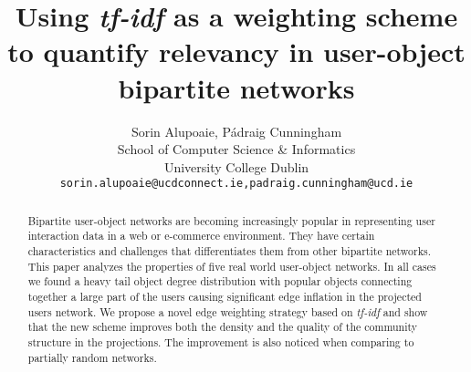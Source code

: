\documentclass[a4paper,12pt]{article} %
\title{Using \emph{tf-idf} as a weighting scheme to quantify relevancy in
user-object bipartite networks}
\author{
Sorin Alupoaie, P\'{a}draig Cunningham \\
School of Computer Science \& Informatics\\
University College Dublin\\
\small{\texttt{sorin.alupoaie@ucdconnect.ie,padraig.cunningham@ucd.ie}} \\
}
\begin{document}
\maketitle

\begin{abstract}
Bipartite user-object networks are becoming increasingly popular in representing
user interaction data in a web or e-commerce environment. They have certain
characteristics and challenges that differentiates them from other bipartite
networks. This paper analyzes the properties of five real world user-object
networks. In all cases we found a heavy tail object degree distribution with
popular objects connecting together a large part of the users causing
significant edge inflation in the projected users network. We propose a novel
edge weighting strategy based on \emph{tf-idf} and show that the new scheme
improves both the density and the quality of the community structure in the
projections. The improvement is also noticed when comparing to partially random
networks.
\end{abstract}










\end{document}
